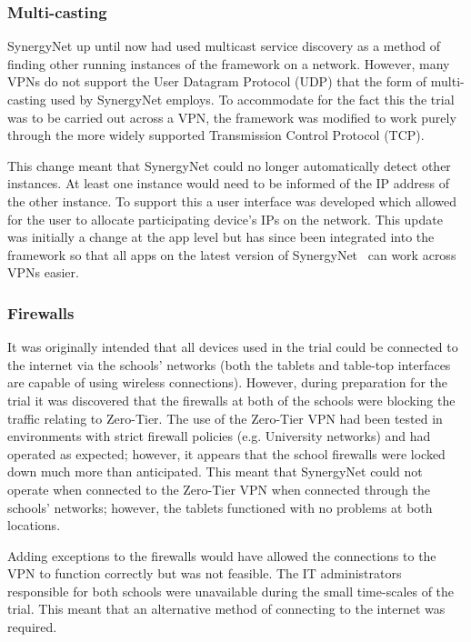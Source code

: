 \documentclass[a4paper,11pt]{article}
\begin{document}
\subsubsection{Multi-casting}

SynergyNet up until now had used multicast service discovery as a method of finding other running instances of the framework on a network.
However, many VPNs do not support the User Datagram Protocol (UDP) that the form of multi-casting used by SynergyNet employs.
To accommodate for the fact this the trial was to be carried out across a VPN, the framework was modified to work purely through the more widely supported Transmission Control Protocol (TCP).

This change meant that SynergyNet could no longer automatically detect other instances.
At least one instance would need to be informed of the IP address of the other instance.
To support this a user interface was developed which allowed for the user to allocate participating device's IPs on the network.
This update was initially a change at the app level but has since been integrated into the framework so that all apps on the latest version of SynergyNet~\cite{hatch:2011} can work across VPNs easier.

\subsubsection{Firewalls}

It was originally intended that all devices used in the trial could be connected to the internet via the schools' networks (both the tablets and table-top interfaces are capable of using wireless connections).
However, during preparation for the trial it was discovered that the firewalls at both of the schools were blocking the traffic relating to Zero-Tier.
The use of the Zero-Tier VPN had been tested in environments with strict firewall policies (e.g. University networks) and had operated as expected; however, it appears that the school firewalls were locked down much more than anticipated.
This meant that SynergyNet could not operate when connected to the Zero-Tier VPN when connected through the schools’ networks; however, the tablets functioned with no problems at both locations.

Adding exceptions to the firewalls would have allowed the connections to the VPN to function correctly but was not feasible.
The IT administrators responsible for both schools were unavailable during the small time-scales of the trial.
This meant that an alternative method of connecting to the internet was required.
\end{document}
